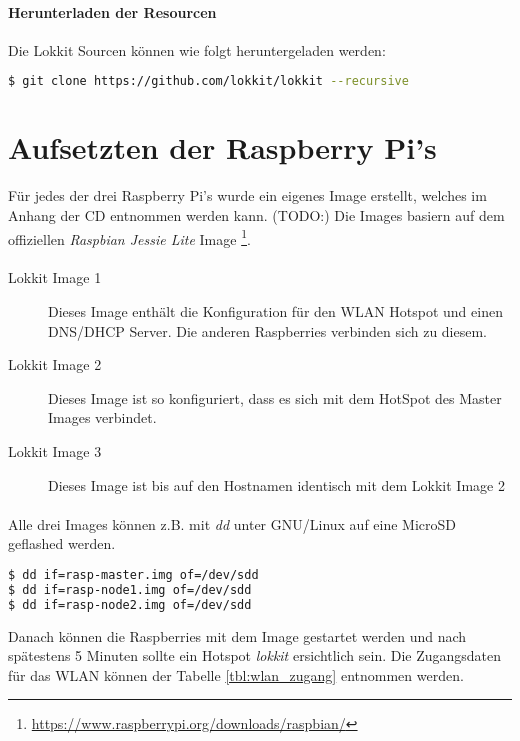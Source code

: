 \paragraph{Herunterladen der Resourcen}

Die Lokkit Sourcen können wie folgt heruntergeladen werden:

\begin{lstlisting}[language=bash]
$ git clone https://github.com/lokkit/lokkit --recursive
\end{lstlisting}

\section{Aufsetzten der Raspberry Pi's}
Für jedes der drei Raspberry Pi's wurde ein eigenes Image erstellt, welches im Anhang der CD entnommen werden kann. (TODO:) Die Images basiern auf dem offiziellen \emph{Raspbian Jessie Lite} Image \footnote{\url{https://www.raspberrypi.org/downloads/raspbian/}}.

\paragraph{}
\begin{description}
    \item[Lokkit Image 1] Dieses Image enthält die Konfiguration für den WLAN Hotspot und einen DNS/DHCP Server. Die anderen Raspberries verbinden sich zu diesem.
    \item[Lokkit Image 2] Dieses Image ist so konfiguriert, dass es sich mit dem HotSpot des Master Images verbindet.
    \item[Lokkit Image 3] Dieses Image ist bis auf den Hostnamen identisch mit dem Lokkit Image 2
\end{description}

\paragraph{}
Alle drei Images können z.B. mit \emph{dd} unter GNU/Linux auf eine MicroSD geflashed werden. 

\begin{lstlisting}[language=bash,caption={Beispiel \emph{dd} unter GNU/Linux}]
$ dd if=rasp-master.img of=/dev/sdd
$ dd if=rasp-node1.img of=/dev/sdd
$ dd if=rasp-node2.img of=/dev/sdd
\end{lstlisting}

Danach können die Raspberries mit dem Image gestartet werden und nach spätestens 5 Minuten sollte ein Hotspot \emph{lokkit} ersichtlich sein. Die Zugangsdaten für das WLAN können der Tabelle \ref{tbl:wlan_zugang} entnommen werden.  

